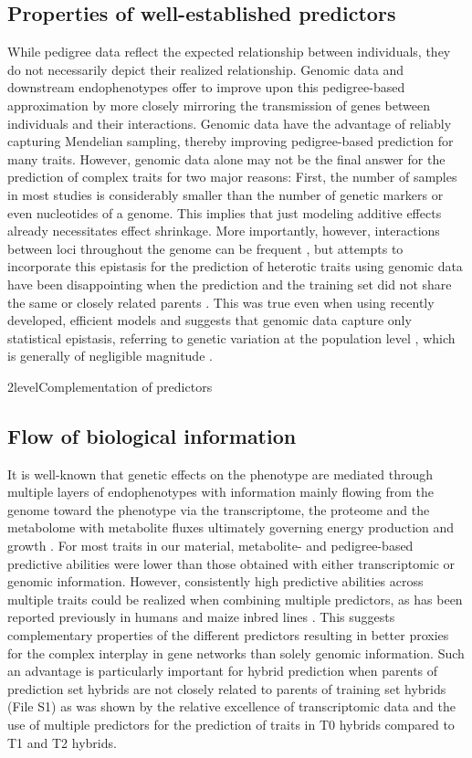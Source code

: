 \documentclass[12pt,titlepage]{article}
\begin{document}
\subsection{Properties of well-established predictors}
While pedigree data reflect the expected relationship between individuals, they 
do not necessarily depict their realized relationship.
Genomic data and downstream endophenotypes offer to improve upon this
pedigree-based approximation by more closely mirroring the transmission of 
genes between individuals and their interactions.
Genomic data have the advantage of reliably capturing Mendelian sampling, 
thereby improving pedigree-based prediction for many traits.
However, genomic data alone may not be the final answer for the prediction of
complex traits for two major reasons:
First, the number of samples in most studies is considerably smaller than the
number of genetic markers or even nucleotides of a genome.
This implies that just modeling additive effects already necessitates effect 
shrinkage.
More importantly, however, interactions between loci throughout the genome 
can be frequent \cite{Brem2005,Brown2014}, but attempts to incorporate this 
epistasis for the prediction of heterotic traits using genomic data have been 
disappointing when the prediction and the training set did not share the same
or closely related parents \cite{Jiang2015}.
This was true even when using recently developed, efficient models 
\cite{Jarquin2014,Martini2016} and suggests that genomic data capture 
only statistical epistasis, referring to genetic variation at the population 
level \cite{Sackton2016}, which is generally of negligible magnitude 
\cite{Hill2008,Mackay2014,Guo2016,Vazquez2016}.




\Genetics2level{Complementation of predictors}
\subsection{Flow of biological information}
It is well-known that genetic effects on the phenotype are mediated through
multiple layers of endophenotypes \cite{Civelek2014,Ritchie2015b} with 
information mainly flowing from the genome toward the phenotype via the 
transcriptome, the proteome and the metabolome with metabolite fluxes 
ultimately governing energy production and growth \cite{Cornish-Bowden2001}.
For most traits in our material, metabolite- and pedigree-based predictive
abilities were lower than those obtained with either transcriptomic or genomic
information.
However, consistently high predictive abilities across multiple traits could be
realized when combining multiple predictors, as has been reported previously in 
humans \cite{Vazquez2016} and maize inbred lines \cite{Guo2016}.
This suggests complementary properties of the different predictors resulting in 
better proxies for the complex interplay in gene networks than solely genomic 
information.
Such an advantage is particularly important for hybrid prediction when parents 
of prediction set hybrids are not closely related to parents of training set
hybrids (File S1) as was shown by the relative excellence of transcriptomic 
data and the use of multiple predictors for the prediction of traits in T0 
hybrids compared to T1 and T2 hybrids.
\end{document}
